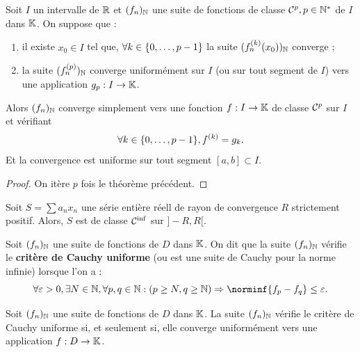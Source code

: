 \documentclass{article}
\begin{document}
\begin{coro}
Soit $I$ un intervalle de $\mathbb{R}$ et $(f_n)_{\mathbb{N}}$ une suite de fonctions de classe $\mathcal{C}^p, p \in \mathbb{N}^\ast$ de $I$ dans $\mathbb{K}$.
On suppose que :
\begin{enumerate}[label=(\roman*)]
\item il existe $x_0 \in I$ tel que, $\forall k \in \{ 0, \dots, p-1 \}$ la suite $(f^{(k)}_n(x_0))_{\mathbb{N}}$ converge ;
\item la suite $(f^{(p)}_n)_{\mathbb{N}}$ converge uniformément sur $I$ (ou sur tout segment de $I$) vers une application $g_p:I \to \mathbb{K}$.
\end{enumerate}
Alors $(f_n)_{\mathbb{N}}$ converge simplement vers une fonction $f:I \to \mathbb{K}$ de classe $\mathcal{C}^p$ sur $I$ et vérifiant 
\[ \forall  k \in \{ 0, \dots, p-1 \}, f^{(k)} = g_k . \]
Et la convergence est uniforme sur tout segment $[a,b] \subset I$.
\end{coro}

\begin{proof}
On itère $p$ fois le théorème précédent.
\end{proof}

\begin{coro}
Soit $S = \sum a_n x_n$ une série entière réell de rayon de convergence $R$ strictement positif. Alors, $S$ est de classe $\mathcal{C}^{\inf}$ 
sur $]-R, R[$.
\end{coro}

\begin{defn}
Soit $(f_n)_{\mathbb{N}}$ une suite de fonctions de $D$ dans $\mathbb{K}$. On dit que la suite $(f_n)_{\mathbb{N}}$ vérifie le \textbf{critère de Cauchy uniforme} (ou est une suite de Cauchy pour la norme infinie) lorsque l'on a :
\[ \forall \veps > 0, \exists N \in \N, \forall p,q \in \N : (p \geq N, q \geq \N) \Rightarrow \norminf{f_p - f_q} \leq \veps . \]
\end{defn}

\begin{thm}
Soit $(f_n)_{\mathbb{N}}$ une suite de fonctions de $D$ dans $\mathbb{K}$. La suite $(f_n)_{\mathbb{N}}$ vérifie le critère de Cauchy uniforme si, et seulement si,
elle converge uniformément vers une application $f : D \to \mathbb{K}$.
\end{thm}
\end{document}
